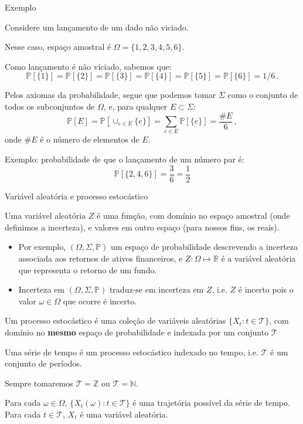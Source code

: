 \documentclass[11pt]{beamer}
\newenvironment{halfwideitemize}{\itemize\addtolength{\itemsep}{0.5em}}{\enditemize}
\begin{document}
	\begin{frame}{Exemplo}
		\begin{halfwideitemize}
			\item Considere um lançamento de um dado não viciado.
			\item Nesse caso, espaço amostral é $\Omega = \{1,2,3,4,5,6\}$.
			\item Como lançamento é não viciado, sabemos que:
			$$\mathbb{P}[\{1\}]= \mathbb{P}[\{2\}] = \mathbb{P}[\{3\}] = \mathbb{P}[\{4\}] = \mathbb{P}[\{5\}] = \mathbb{P}[\{6\}] = 1/6 \,.$$
			\item Pelos axiomas da probabilidade, segue que podemos tomar $\Sigma$ como o conjunto de todos os subconjuntos de $\Omega$, e, para qualquer $E\subset \Sigma$:
			$$\mathbb{P}[E]= \mathbb{P}[\cup_{e \in E}\{e\}] = \sum_{e \in E}\mathbb{P}[\{e\}] = \frac{\# E}{6}\, ,$$
			onde $\# E$ é o número de elementos de $E$.
			\item Exemplo: probabilidade de que o lançamento de um número par é:
			$$\mathbb{P}[\{2,4,6\}]= \frac{3}{6} = \frac{1}{2}$$
		\end{halfwideitemize}
	\end{frame}
	
	
	\begin{frame}{Variável aleatória e processo estocástico}
		\begin{halfwideitemize}
			\item Uma {\color{blue}variável aleatória} $Z$ é uma {\color{blue}função}, com domínio no espaço amostral (onde definimos a incerteza), e valores em outro espaço (para nossos fins, os reais).
			\begin{itemize}
				\item Por exemplo, $(\Omega, \Sigma, \mathbb{P})$ um espaço de probabilidade descrevendo a incerteza associada aos retornos de ativos financeiros, e $Z: \Omega \mapsto \mathbb{R}$ é a variável aleatória que representa o retorno de um fundo.
				\item Incerteza em $(\Omega, \Sigma, \mathbb{P})$ traduz-se em incerteza em $Z$, i.e. $Z$ é incerto pois o valor $\omega \in \Omega$ que ocorre é incerto.
			\end{itemize}
			\item Um {\color{blue} processo estocástico} é uma coleção de variáveis aleatórias $\{X_t: t \in \mathcal{T}\}$, com domínio no \textbf{mesmo} espaço de probabilidade e indexada por um conjunto $\mathcal{T}$
			\item Uma {\color{blue}série de tempo} é um processo estocástico indexado no tempo, i.e. $\mathcal{T}$ é um conjunto de períodos.
			\begin{halfwideitemize}
				\item Sempre tomaremos $\mathcal{T} = \mathbb{Z}$ ou $\mathcal{T}  =\mathbb{N}$.
				\item Para cada $\omega \in \Omega$, $\{ X_t(\omega): t \in \mathcal{T} \}$ é uma trajetória {\color{blue}possível} da série de tempo. Para cada $t \in \mathcal{T}$, $X_t$ é uma variável aleatória.
			\end{halfwideitemize}
		\end{halfwideitemize}
	\end{frame}
	
\end{document}
